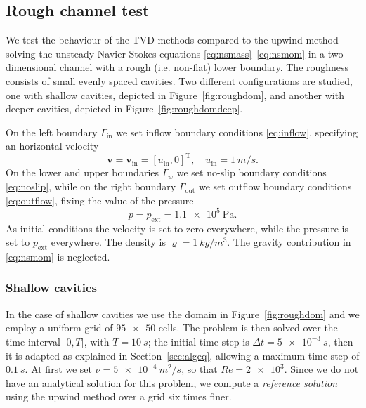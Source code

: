 \subsection{Rough channel test}
We test the behaviour of the TVD methods compared to the upwind method solving 
the unsteady Navier-Stokes equations \eqref{eq:nsmass}--\eqref{eq:nsmom} in 
a two-dimensional channel with a rough (i.e. non-flat) lower boundary. The 
roughness consists of small evenly spaced cavities. Two different 
configurations are studied, one with shallow cavities, depicted in 
Figure~\ref{fig:roughdom}, and another with deeper cavities, depicted in 
Figure~\ref{fig:roughdomdeep}.

On the left boundary $\Gamma_\text{in}$ we set inflow boundary conditions 
\eqref{eq:inflow}, specifying an horizontal velocity
\begin{equation}
	\mathbf{v} = \mathbf{v}_\text{in} = [u_\text{in}, 0]^\mathrm{T}, \quad 
	u_\text{in} = \SI{1}{m/s}.
\end{equation}
On the lower and upper boundaries $\Gamma_w$ we set no-slip boundary conditions 
\eqref{eq:noslip}, while on the right boundary $\Gamma_\text{out}$ we set 
outflow boundary conditions \eqref{eq:outflow}, fixing the value of the pressure
\begin{equation}
	p = p_\text{ext} = \SI{1.1e5}{\pascal}.
\end{equation}
As initial conditions the velocity is set to zero everywhere, while the 
pressure is set to $p_\text{ext}$ everywhere. The density is 
$\varrho=\SI{1}{kg/m^3}$. The gravity contribution in \eqref{eq:nsmom} is 
neglected.
%
\subsubsection{Shallow cavities}
In the case of shallow cavities we use the domain in Figure~\ref{fig:roughdom} 
and we employ a uniform grid of $\num{95x50}$ cells. The problem is then solved 
over the time interval [$0,T$], with $T=\SI{10}{s}$; the initial time-step is 
$\Delta t=\SI{5e-3}{s}$, then it is adapted as explained in 
Section~\ref{sec:algeq}, allowing a maximum time-step of $\SI{0.1}{s}$. 
At first we set $\nu=\SI{5e-4}{m^2/s}$, so that $Re=\num{2e3}$. Since we do not 
have an analytical solution for this problem, we compute a \emph{reference 
solution} using the upwind method over a grid six times finer.


